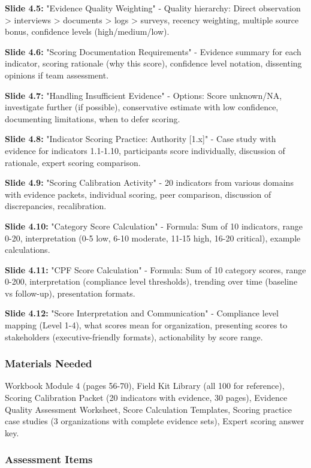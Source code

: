 \documentclass[11pt,a4paper]{article}
\begin{document}
\textbf{Slide 4.5:} "Evidence Quality Weighting" - Quality hierarchy: Direct observation > interviews > documents > logs > surveys, recency weighting, multiple source bonus, confidence levels (high/medium/low).

\textbf{Slide 4.6:} "Scoring Documentation Requirements" - Evidence summary for each indicator, scoring rationale (why this score), confidence level notation, dissenting opinions if team assessment.

\textbf{Slide 4.7:} "Handling Insufficient Evidence" - Options: Score unknown/NA, investigate further (if possible), conservative estimate with low confidence, documenting limitations, when to defer scoring.

\textbf{Slide 4.8:} "Indicator Scoring Practice: Authority [1.x]" - Case study with evidence for indicators 1.1-1.10, participants score individually, discussion of rationale, expert scoring comparison.

\textbf{Slide 4.9:} "Scoring Calibration Activity" - 20 indicators from various domains with evidence packets, individual scoring, peer comparison, discussion of discrepancies, recalibration.

\textbf{Slide 4.10:} "Category Score Calculation" - Formula: Sum of 10 indicators, range 0-20, interpretation (0-5 low, 6-10 moderate, 11-15 high, 16-20 critical), example calculations.

\textbf{Slide 4.11:} "CPF Score Calculation" - Formula: Sum of 10 category scores, range 0-200, interpretation (compliance level thresholds), trending over time (baseline vs follow-up), presentation formats.

\textbf{Slide 4.12:} "Score Interpretation and Communication" - Compliance level mapping (Level 1-4), what scores mean for organization, presenting scores to stakeholders (executive-friendly formats), actionability by score range.

\subsubsection{Materials Needed}

Workbook Module 4 (pages 56-70), Field Kit Library (all 100 for reference), Scoring Calibration Packet (20 indicators with evidence, 30 pages), Evidence Quality Assessment Worksheet, Score Calculation Templates, Scoring practice case studies (3 organizations with complete evidence sets), Expert scoring answer key.

\subsubsection{Assessment Items}
\end{document}
